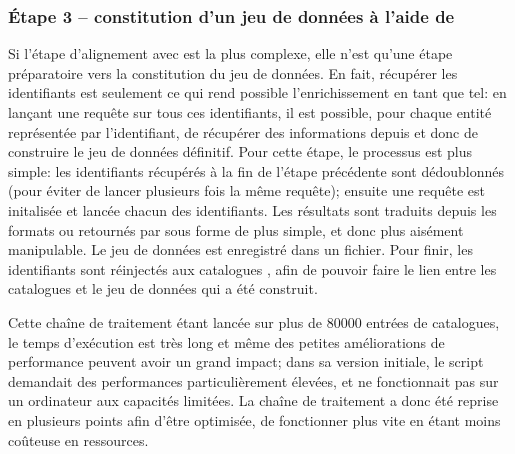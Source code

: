 \subsubsection{Étape 3 -- constitution d'un jeu de données à l'aide de \sparql{}}
Si l'étape d'alignement avec \wkd{} est la plus complexe, elle n'est qu'une étape préparatoire vers la constitution du jeu de données. En fait, récupérer les identifiants est seulement ce qui rend possible l'enrichissement en tant que tel: en lançant une requête \sparql{} sur tous ces identifiants, il est possible, pour chaque entité représentée par l'identifiant, de récupérer des informations depuis \wkd{} et donc de construire le jeu de données définitif. Pour cette étape, le processus est plus simple: les identifiants récupérés à la fin de l'étape précédente sont dédoublonnés (pour éviter de lancer plusieurs fois la même requête); ensuite une requête \sparql{} est initalisée et lancée chacun des identifiants. Les résultats sont traduits depuis les formats \json{} ou \xml{} retournés par \sparql{} sous forme de \json{} plus simple, et donc plus aisément manipulable. Le jeu de données est enregistré dans un fichier. Pour finir, les identifiants \wkd{} sont réinjectés aux catalogues \tei{}, afin de pouvoir faire le lien entre les catalogues et le jeu de données qui a été construit.

Cette chaîne de traitement étant lancée sur plus de 80000 entrées de catalogues, le temps d'exécution est très long et même des petites améliorations de performance peuvent avoir un grand impact; dans sa version initiale, le script demandait des performances particulièrement élevées, et ne fonctionnait pas sur un ordinateur aux capacités limitées. La chaîne de traitement a donc été reprise en plusieurs points afin d'être optimisée, de fonctionner plus vite en étant moins coûteuse en ressources.

